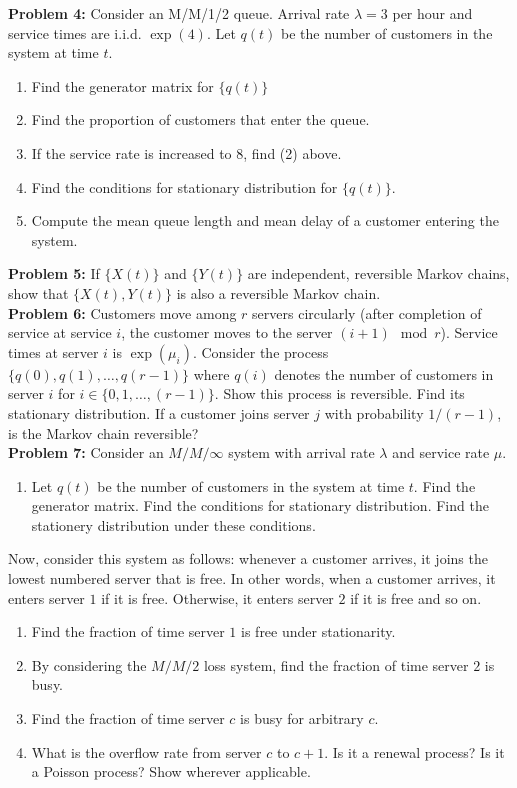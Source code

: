 \documentclass[a4paper,11pt,english]{article}
\begin{document}
\indent \textbf{Problem 4:} Consider an M/M/1/2 queue. Arrival rate $\lambda = 3$ per hour and service times are i.i.d. $\exp(4)$. Let $q(t)$ be the number of customers in the system at time $t$. 
\begin{enumerate}
\item Find the generator matrix for $\{q(t)\}$
\item Find the proportion of customers that enter the queue. 
\item If the service rate is increased to $8$, find (2) above. 
\item Find the conditions for stationary distribution for $\{q(t)\}$.
\item Compute the mean queue length and mean delay of a customer entering the system. 
\end{enumerate}

\indent \textbf{Problem 5:} If $\{X(t)\}$ and $\{Y(t)\}$ are independent, reversible Markov chains, show that $\{X(t),Y(t)\}$ is also a reversible Markov chain. \\
\indent \textbf{Problem 6:} Customers move among $r$ servers circularly (after completion of service at service $i$, the customer moves to the server  $(i+1) \mod r$). Service times at server $i$  is $\exp(\mu_i)$. Consider the process $\{q(0),q(1),\dots,q(r-1)\}$ where $q(i)$ denotes the number of customers in server $i$ for $i \in \{0,1,\dots,(r-1)\}$. Show this process is reversible. Find its stationary distribution.  If a customer joins server $j$ with probability $1/(r-1)$,  is the Markov chain reversible?\\
\indent \textbf{Problem 7:} Consider an $M/M/\infty$ system with arrival rate $\lambda$ and service rate $\mu$. 
\begin{enumerate}
\item Let $q(t)$ be the number of customers in the system at time $t$. Find the generator matrix. Find the conditions for stationary distribution. Find the stationery distribution under these conditions. 
\end{enumerate}
Now, consider this system as follows: whenever a customer arrives, it joins the lowest numbered server that is free. In other words, when a customer arrives, it enters server $1$ if it is free. Otherwise, it enters server $2$ if it is free and so on.
\begin{enumerate}
\item Find the fraction of time server $1$ is free under stationarity.
\item By considering the $M/M/2$ loss system, find the fraction of time server $2$ is busy.
\item Find the fraction of time server $c$  is busy for arbitrary $c$.
\item What is the overflow rate from server $c$ to $c+1$. Is it a renewal process? Is it a Poisson process? Show wherever applicable.
\end{enumerate}
\end{document}
